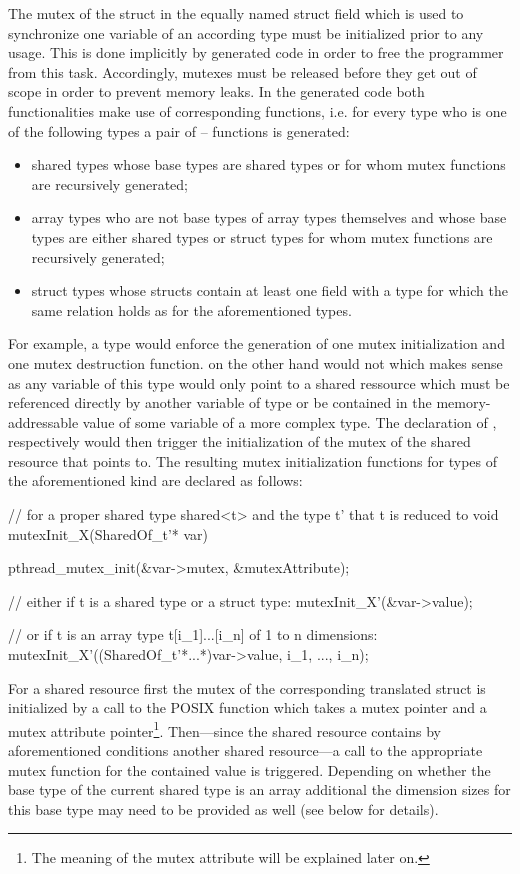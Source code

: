 The mutex of the struct  in the equally named struct field  which is used to synchronize one variable of an according type  must be initialized prior to any usage. This is done implicitly by generated code in order to free the programmer from this task. Accordingly, mutexes must be released before they get out of scope in order to prevent memory leaks. In the generated code both functionalities make use of corresponding functions, i.e. for every type who is one of the following types a pair of -- functions is generated:

\begin{itemize}
\item shared types whose base types are shared types or for whom mutex functions are recursively generated;
\item array types who are not base types of array types themselves and whose base types are either shared types or struct types for whom mutex functions are recursively generated;
\item struct types whose structs contain at least one field with a type for which the same relation holds as for the aforementioned types.
\end{itemize}

For example, a type  would enforce the generation of one mutex initialization and one mutex destruction function.  on the other hand would not which makes sense as any variable  of this type would only point to a shared ressource which must be referenced directly by another variable  of type  or be contained in the memory-addressable value of some variable  of a more complex type. The declaration of , respectively  would then trigger the initialization of the mutex of the shared resource that  points to. The resulting mutex initialization functions for types of the aforementioned kind are declared as follows:

\begin{ccode}
// for a proper shared type shared<t> and the type t' that t is reduced to
void mutexInit_X(SharedOf_t'* var) { 
  pthread_mutex_init(&var->mutex, &mutexAttribute);
  
  // either if t is a shared type or a struct type:
  mutexInit_X'(&var->value); 
  
  // or if t is an array type t[i_1]...[i_n] of 1 to n dimensions:
  mutexInit_X'((SharedOf_t'*...*)var->value, i_1, ..., i_n); 
}
\end{ccode}
For a shared resource first the mutex of the corresponding translated struct is initialized by a call to the POSIX function  which takes a mutex pointer and a mutex attribute pointer\footnote{The meaning of the mutex attribute will be explained later on.}. Then---since the shared resource contains by aforementioned conditions another shared resource---a call to the appropriate mutex function for the contained value is triggered. Depending on whether the base type of the current shared type is an array additional the dimension sizes for this base type may need to be provided as well (see below for details).

